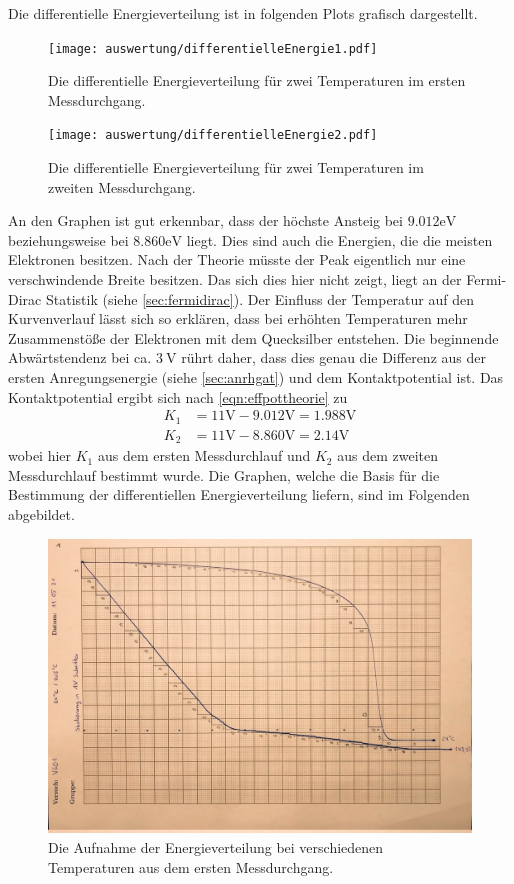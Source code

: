 Die differentielle Energieverteilung ist in folgenden Plots grafisch dargestellt.

\begin{figure}[H]
  \centering
  \texttt{[image: auswertung/differentielleEnergie1.pdf]}
  \caption{Die differentielle Energieverteilung für zwei Temperaturen im ersten Messdurchgang.}
  \label{fig:diffenergie1}
\end{figure}

\begin{figure}[H]
  \centering
  \texttt{[image: auswertung/differentielleEnergie2.pdf]}
  \caption{Die differentielle Energieverteilung für zwei Temperaturen im zweiten Messdurchgang.}
  \label{fig:diffenergie2}
\end{figure}
\noindent
An den Graphen ist gut erkennbar, dass der höchste Ansteig bei $9.012\si{\electronvolt}$
beziehungsweise bei $8.860\si{\electronvolt}$ liegt. Dies sind auch die Energien, die die meisten
Elektronen besitzen.
Nach der Theorie müsste der Peak eigentlich nur eine verschwindende Breite besitzen.
Das sich dies hier nicht zeigt, liegt an der Fermi-Dirac Statistik (siehe \ref{sec:fermidirac}).
Der Einfluss der Temperatur auf den Kurvenverlauf lässt sich so erklären, dass bei erhöhten
Temperaturen mehr Zusammenstöße der Elektronen mit dem Quecksilber entstehen.
Die beginnende Abwärtstendenz bei ca. $\SI{3}{\volt}$ rührt daher, dass dies genau die
Differenz aus der ersten Anregungsenergie (siehe \ref{sec:anrhgat}) und dem Kontaktpotential ist.
\noindent
Das Kontaktpotential ergibt sich nach \eqref{eqn:effpottheorie} zu
\begin{align}
  K_1  & = 11 \si{\volt} -  9.012 \si{\volt} = 1.988 \si{\volt} \\
  K_2  & = 11 \si{\volt} -  8.860 \si{\volt} = 2.14  \si{\volt}
  \label{eqn:kpotausw}
\end{align}
\noindent
wobei hier $K_1$ aus dem ersten Messdurchlauf und $K_2$ aus dem zweiten Messdurchlauf bestimmt wurde.
Die Graphen, welche die Basis für die Bestimmung der differentiellen Energieverteilung liefern, sind
im Folgenden abgebildet.
\begin{figure}[H]
  \centering
  \includegraphics[scale=0.25]{content/kurve1.jpeg}
  \caption{Die Aufnahme der Energieverteilung bei verschiedenen Temperaturen aus dem ersten Messdurchgang.}
  \label{fig:franckhertz1}
\end{figure}

